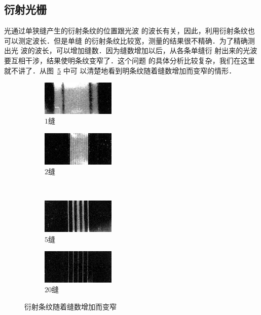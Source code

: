 \subsection{衍射光栅}


光通过单狭缝产生的衍射条纹的位置跟光波
的波长有关，因此，利用衍射条纹也可以测定波长．但是单缝
的衍射条纹比较宽，测量的结果很不精确．为了精确测出光
波的波长，可以增加缝数．因为缝数增加以后，从各条单缝衍
射出来的光波要互相干涉，结果使明条纹变窄了．这个问题
的具体分析比较复杂，我们在这里就不讲了．从图~\ref{fig_C_6-9} 中可
以清楚地看到明条纹随着缝数增加而变窄的情形．
\begin{figure}[htbp]
	\centering
	\begin{subfigure}{0.4\linewidth}
		\centering
		\includegraphics[width=3.5cm]{fig/C/6-9a.png}
		\caption{$1$缝}\label{fig_C_6-9a}
	\end{subfigure}
	\hfil
	\begin{subfigure}{0.4\linewidth}
		\centering
		\includegraphics[width=3.5cm]{fig/C/6-9b.png}
		\caption{$2$缝}\label{fig_C_6-9b}
	\end{subfigure}
	\\
	\begin{subfigure}{0.4\linewidth}
		\centering
		\includegraphics[width=3.5cm]{fig/C/6-9c.png}
		\caption{$5$缝}\label{fig_C_6-9c}
	\end{subfigure}
	\hfil
	\begin{subfigure}{0.4\linewidth}
		\centering
		\includegraphics[width=3.5cm]{fig/C/6-9d.png}
		\caption{$20$缝}\label{fig_C_6-9d}
	\end{subfigure}
	\caption{衍射条纹随着缝数增加而变窄}\label{fig_C_6-9}
\end{figure}



